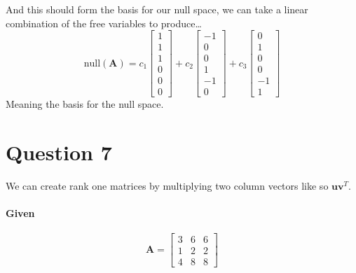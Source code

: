 \documentclass{article}
\begin{document}
            And this should form the basis for our null space, we can take
            a linear combination of the free variables to produce\dots
            \[
                \text{null}(\mathbf{A})=
                c_1\begin{bmatrix}1\\1\\1\\0\\0\\0\end{bmatrix}+
                c_2\begin{bmatrix}-1\\0\\0\\1\\-1\\0\end{bmatrix}+
                c_3\begin{bmatrix}0\\1\\0\\0\\-1\\1\end{bmatrix}
            \]
            Meaning the basis for the null space.
    \section{Question 7}
        We can create rank one matrices by multiplying two column vectors like so $\mathbf{u}\mathbf{v}^T$.
        \paragraph{Given}
            \[
                \mathbf{A}=\begin{bmatrix}3&6&6\\1&2&2\\4&8&8\end{bmatrix}
            \]
\end{document}
